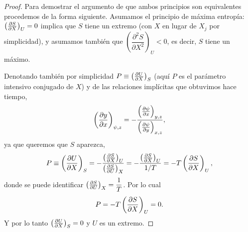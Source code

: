 \begin{proof}
Para demostrar el argumento de que ambos principios son equivalentes procedemos de la forma
siguiente. Asumamos el principio de máxima entropía: $\left(\frac{\partial S}{\partial X}\right)_{U}=0$ implica que $S$ tiene un
extremo (con $X$ en lugar de $X_j$ por simplicidad), y asumamos también que
$\left(\dfrac{\partial^{2}S}{\partial X^{2}}\right)_{U}<0$, es decir, $S$ tiene un máximo.

Denotando también por simplicidad $P\equiv\left(\frac{\partial U}{\partial X}\right)_{S}$ (aquí $P$ es el parámetro intensivo
conjugado de $X$) y de las relaciones implícitas que obtuvimos hace tiempo,
\begin{equation*}
  \left(\frac{\partial y}{\partial x}\right)_{\psi,z}=-\frac{\left(\frac{\partial \psi}{\partial x}\right)_{y,z}}{\left(\frac{\partial \psi}{\partial y}\right)_{x,z}},
\end{equation*}
ya que queremos que $S$ aparezca,
\begin{equation*}
  P\equiv\left(\frac{\partial U}{\partial X}\right)_{S}=-\frac{\left(\frac{\partial S}{\partial X}\right)_{U}}{\left(\frac{\partial S}{\partial U}\right)_{X}}=-\frac{\left(\frac{\partial S}{\partial X}\right)_{U}}{1/T}=-T\left(\frac{\partial S}{\partial X}\right)_{U},
\end{equation*}
donde se puede identificar $\left(\frac{\partial S}{\partial U}\right)_{X}=\dfrac{1}{T}$. Por lo cual
\begin{equation*}
  P=-T\left(\frac{\partial S}{\partial X}\right)_{U}=0.
\end{equation*}
Y por lo tanto $\left(\frac{\partial U}{\partial X}\right)_{S}=0$ y $U$ es un extremo.


\end{proof}
